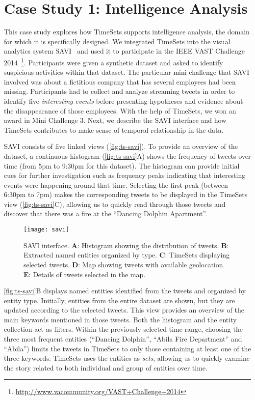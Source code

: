 \section{Case Study 1: Intelligence Analysis}
\label{sub:ts-vast}
This case study explores how TimeSets supports intelligence analysis, the domain for which it is specifically designed. We integrated TimeSets into the visual analytics system SAVI~\cite{Xu2014} and used it to participate in the IEEE VAST Challenge 2014~\footnote{\url{http://www.vacommunity.org/VAST+Challenge+2014}}. Participants were given a synthetic dataset and asked to identify suspicious activities within that dataset. The particular mini challenge that SAVI involved was about a fictitious company that has several employees had been missing. Participants had to collect and analyze streaming tweets in order to identify five \emph{interesting events} before presenting hypotheses and evidence about the disappearance of those employees. With the help of TimeSets, we won an award in Mini Challenge 3. Next, we describe the SAVI interface and how TimeSets contributes to make sense of temporal relationship in the data.

SAVI consists of five linked views (\autoref{fig:ts-savi}). To provide an overview of the dataset, a continuous histogram (\autoref{fig:ts-savi}A) shows the frequency of tweets over time (from 5pm to 9:30pm for this dataset). The histogram can provide initial cues for further investigation such as frequency peaks indicating that interesting events were happening around that time. Selecting the first peak (between 6:30pm to 7pm) makes the corresponding tweets to be displayed in the TimeSets view (\autoref{fig:ts-savi}C), allowing us to quickly read through those tweets and discover that there was a fire at the ``Dancing Dolphin Apartment''. 

\begin{figure}[!htb]
	\centering
	\texttt{[image: savi]}
	\caption{SAVI interface. \textbf{A}: Histogram showing the distribution of tweets. \textbf{B}: Extracted named entities organized by type. \textbf{C}: TimeSets displaying selected tweets. \textbf{D}: Map showing tweets with available geolocation. \textbf{E}: Details of tweets selected in the map.}
	\label{fig:ts-savi}
\end{figure}

\autoref{fig:ts-savi}B displays named entities identified from the tweets and organized by entity type. Initially, entities from the entire dataset are shown, but they are updated according to the selected tweets. This view provides an overview of the main keywords mentioned in those tweets. Both the histogram and the entity collection act as filters. Within the previously selected time range, choosing the three most frequent entities (``Dancing Dolphin'', ``Abila Fire Department'' and ``Abila'') limits the tweets in TimeSets to only those containing at least one of the three keywords. TimeSets uses the entities as \emph{sets}, allowing us to quickly examine the story related to both individual and group of entities over time.

